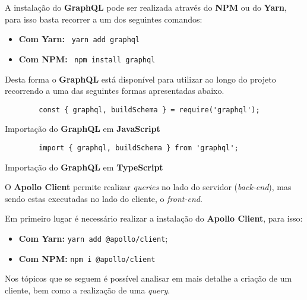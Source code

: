 \label{graphqlAttachments}


A instalação do \textbf{GraphQL} pode ser realizada através do \textbf{NPM} ou do \textbf{Yarn}, para isso basta recorrer a um dos seguintes comandos:

\begin{itemize}
	\item \textbf{Com Yarn:} ~\texttt{yarn add graphql}
	\item \textbf{Com NPM:} ~\texttt{npm install graphql}
\end{itemize}

Desta forma o \textbf{GraphQL} está disponível para utilizar ao longo do projeto recorrendo a uma das seguintes formas apresentadas abaixo.

\begin{longlisting}
	\begin{verbatim}
		const { graphql, buildSchema } = require('graphql');
	\end{verbatim}

	\caption{Importação do \textbf{GraphQL} em \textbf{JavaScript}}
\end{longlisting}

\begin{longlisting}
	\begin{verbatim}
		import { graphql, buildSchema } from 'graphql';
	\end{verbatim}

	\caption{Importação do \textbf{GraphQL} em \textbf{TypeScript}}
\end{longlisting}


O \textbf{Apollo Client} permite realizar \textit{queries} no lado do servidor (\textit{back-end}), mas sendo estas executadas no lado do cliente, o \textit{front-end}.

Em primeiro lugar é necessário realizar a instalação do \textbf{Apollo Client}, para isso:

\begin{itemize}
	\item \textbf{Com Yarn:} \verb|yarn add @apollo/client|;
	\item \textbf{Com NPM:} \verb|npm i @apollo/client|
\end{itemize}

Nos tópicos que se seguem é possível analisar em mais detalhe a criação de um cliente, bem como a realização de uma \textit{query}.

